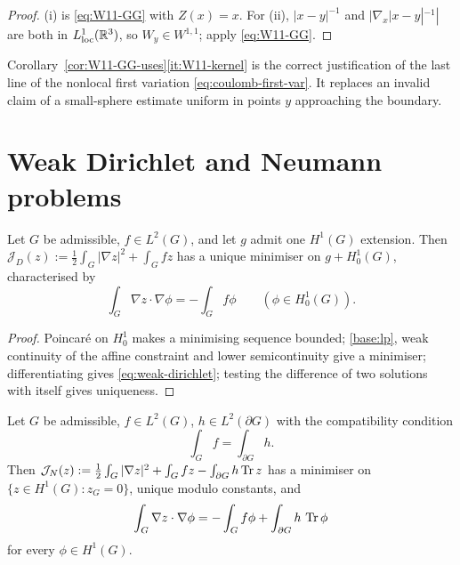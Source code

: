 \begin{proof}
(i) is \eqref{eq:W11-GG} with $Z(x)=x$.  For (ii), $|x-y|^{-1}$ and
$|\nabla_x|x-y|^{-1}|$ are both in $L^1_{\mathrm{loc}}(\mathbb R^3)$, so
$W_y\in W^{1,1}$; apply \eqref{eq:W11-GG}.
\end{proof}

\begin{fnote}\label{fnote:no-small-sphere}
Corollary~\ref{cor:W11-GG-uses}\ref{it:W11-kernel} is the correct
justification of the last line of the nonlocal first variation
\eqref{eq:coulomb-first-var}.  It replaces an invalid claim of a small-sphere
estimate uniform in points $y$ approaching the boundary.
\end{fnote}

\section{Weak Dirichlet and Neumann problems}\label{sec:weak-problems}

\begin{proposition}\label{prop:weak-dirichlet}
Let $G$ be admissible, $f\in L^2(G)$, and let $g$ admit one $H^1(G)$
extension.  Then
$\mathcal J_D(z):=\tfrac12\int_G|\nabla z|^2+\int_Gfz$ has a unique minimiser
on $g+H^1_0(G)$, characterised by
\begin{equation}\label{eq:weak-dirichlet}
  \int_G\nabla z\cdot\nabla\phi=-\int_Gf\phi
  \qquad(\phi\in H^1_0(G)).
\end{equation}
\end{proposition}

\begin{proof}
Poincar\'e on $H^1_0$ makes a minimising sequence bounded; \ref{base:lp},
weak continuity of the affine constraint and lower semicontinuity give a
minimiser; differentiating gives \eqref{eq:weak-dirichlet}; testing the
difference of two solutions with itself gives uniqueness.
\end{proof}

\begin{proposition}\label{prop:weak-neumann}
Let $G$ be admissible, $f\in L^2(G)$, $h\in L^2(\partial G)$ with the
compatibility condition
\begin{equation}\label{eq:neumann-compat}
  \int_Gf=\int_{\partial G}h .
\end{equation}
Then
$\mathcal J_N(z):=\tfrac12\int_G|\nabla z|^2+\int_Gfz-\int_{\partial G}h\operatorname{Tr} z$
has a minimiser on $\{z\in H^1(G):z_G=0\}$, unique modulo constants, and
\begin{equation}\label{eq:weak-neumann}
  \int_G\nabla z\cdot\nabla\phi=-\int_Gf\phi+\int_{\partial G}h\,\operatorname{Tr}\phi
\end{equation}
for every $\phi\in H^1(G)$.
\end{proposition}

